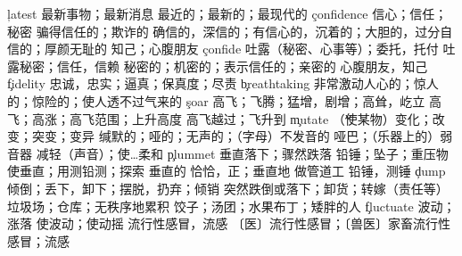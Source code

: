 \begin{multicols}{2}
\c{latest}  \n 最新事物；最新消息 \a 最近的；最新的；最现代的
\c{confidence}  \n 信心；信任；秘密 \a 骗得信任的；欺诈的
  \a 确信的，深信的；有信心的，沉着的；大胆的，过分自信的；厚颜无耻的 \n 知己；心腹朋友
\c{confide}  \vt 吐露（秘密、心事等）；委托，托付 \vi 吐露秘密；信任，信赖
  \a 秘密的；机密的；表示信任的；亲密的
  \n 心腹朋友，知己
\c{fidelity}  \n 忠诚，忠实；逼真；保真度；尽责
\c{breathtaking}  \a 非常激动人心的；惊人的；惊险的；使人透不过气来的
\c{soar}  \vi 高飞；飞腾；猛增，剧增；高耸，屹立 \n 高飞；高涨；高飞范围；上升高度 \vt 高飞越过；飞升到
\c{mutate}  \v （使某物）变化；改变；突变；变异
  \a 缄默的；哑的；无声的；（字母）不发音的 \n 哑巴；（乐器上的）弱音器 \vt 减轻（声音）；使…柔和
\c{plummet}  \vi 垂直落下；骤然跌落 \n 铅锤；坠子；重压物
  \vt 使垂直；用测铅测；探索 \a 垂直的 \ad 恰恰，正；垂直地 \vi 做管道工 \n 铅锤，测锤
\c{dump}  \vt 倾倒；丢下，卸下；摆脱，扔弃；倾销 \vi 突然跌倒或落下；卸货；转嫁（责任等） \n 垃圾场；仓库；无秩序地累积
  \n 饺子；汤团；水果布丁；矮胖的人
\c{fluctuate}  \vi 波动；涨落 \vt 使波动；使动摇
  \n 流行性感冒，流感
  \n 〔医〕流行性感冒；〔兽医〕家畜流行性感冒；流感




\end{multicols}
